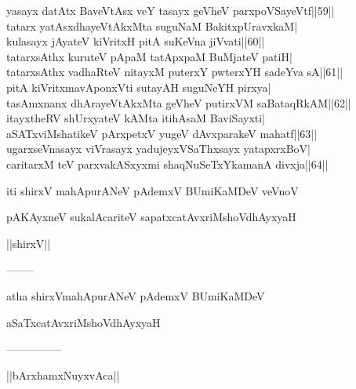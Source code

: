 \documentclass{article}
\begin{document}
yasayx datAtx BaveVtAsx veY tasayx geVheV parxpoVSayeVtf||59||\\
tatarx yatAsxdhayeVtAkxMta suguNaM BakitxpUravxkaM|\\
kulasayx jAyateV kiVritxH pitA suKeVna jiVvati||60||\\
tatarxsAthx kuruteV pApaM tatApxpaM BuMjateV patiH|\\
tatarxsAthx vadhaRteV nitayxM puterxY pwterxYH sadeYva sA||61||\\
pitA kiVritxmavAponxVti sutayAH suguNeYH pirxya|\\
tasAmxnanx dhArayeVtAkxMta geVheV putirxVM saBataqRkAM||62||\\
itayxtheRV shUrxyateV kAMta itihAsaM BaviSayxti|\\
aSATxviMshatikeV pArxpetxV yugeV dAvxparakeV mahatf||63||\\
ugarxseVnasayx viVrasayx yadujeyxVSaThxsayx yatapxrxBoV|\\
caritarxM teV parxvakASxyxmi shaqNuSeTxYkamanA divxja||64||

\begin{center}
iti shirxV mahApurANeV pAdemxV BUmiKaMDeV veVnoV
\end{center}

\begin{center}
pAKAyxneV sukalAcariteV sapatxcatAvxriMshoVdhAyxyaH
\end{center}

\begin{center}
||shirxV||
\end{center}

\begin{center}
--------
\end{center}

\begin{center}
atha shirxVmahApurANeV pAdemxV BUmiKaMDeV
\end{center}

\begin{center}
aSaTxcatAvxriMshoVdhAyxyaH
\end{center}

\begin{center}
---------------
\end{center}

\begin{center}
||bArxhamxNuyxvAca||
\end{center}
\end{document}
